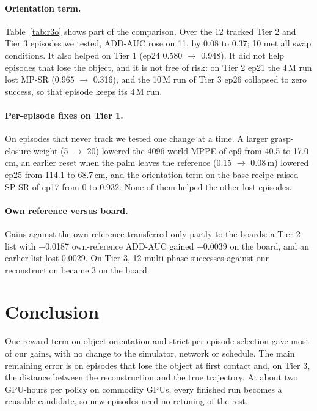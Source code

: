 \documentclass[10pt]{nvidiaextabstract}
\begin{document}
\paragraph{Orientation term.}
Table~\ref{tab:r3o} shows part of the comparison.
Over the 12 tracked Tier 2 and Tier 3 episodes we tested, ADD-AUC rose on 11, by 0.08 to 0.37; 10 met all swap conditions.
It also helped on Tier 1 (ep24 0.580 $\rightarrow$ 0.948).
It did not help episodes that lose the object, and it is not free of risk: on Tier 2 ep21 the 4\,M run lost MP-SR (0.965 $\rightarrow$ 0.316), and the 10\,M run of Tier 3 ep26 collapsed to zero success, so that episode keeps its 4\,M run.

\paragraph{Per-episode fixes on Tier 1.}
On episodes that never track we tested one change at a time. A larger grasp-closure weight (5 $\rightarrow$ 20) lowered the 4096-world MPPE of ep9 from 40.5 to 17.0\,cm, an earlier reset when the palm leaves the reference (0.15 $\rightarrow$ 0.08\,m) lowered ep25 from 114.1 to 68.7\,cm, and the orientation term on the base recipe raised SP-SR of ep17 from 0 to 0.932. None of them helped the other lost episodes.

\paragraph{Own reference versus board.}
Gains against the own reference transferred only partly to the boards: a Tier 2 list with +0.0187 own-reference ADD-AUC gained +0.0039 on the board, and an earlier list lost 0.0029.
On Tier 3, 12 multi-phase successes against our reconstruction became 3 on the board.

\balance

\section{Conclusion}
\label{sec:conclusion}

One reward term on object orientation and strict per-episode selection gave most of our gains, with no change to the simulator, network or schedule.
The main remaining error is on episodes that lose the object at first contact and, on Tier 3, the distance between the reconstruction and the true trajectory.
At about two GPU-hours per policy on commodity GPUs, every finished run becomes a reusable candidate, so new episodes need no retuning of the rest.






\end{document}
